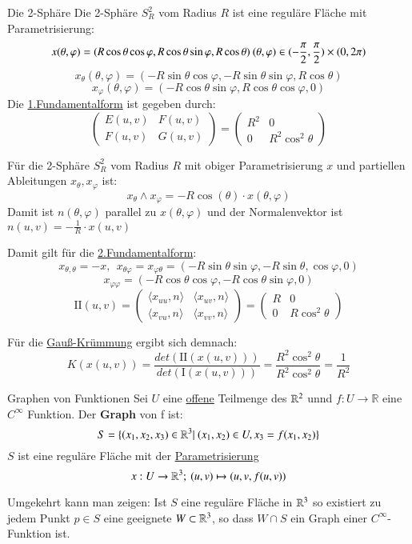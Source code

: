 \begin{titleDef}{Die 2-Sphäre}
\label{regSphere}
Die 2-Sphäre $S_R^2$ vom Radius $R$ ist eine reguläre Fläche mit Parametrisierung:
$$x(\theta,\varphi)=(R\cos\theta\cos\varphi,R\cos\theta\sin\varphi,R\cos\theta)\: (\theta,\varphi)\in(-\frac{\pi}{2},\frac{\pi}{2})\times(0,2\pi)$$
$$x_\theta(\theta,\varphi)=(-R\sin\theta\cos\varphi,-R\sin\theta\sin\varphi,R\cos\theta)$$
$$x_\varphi(\theta,\varphi)=(-R\cos\theta\sin\varphi,R\cos\theta\cos\varphi,0)$$
Die \hyperref[fundamentalformEins]{1.Fundamentalform} ist gegeben durch:
$$\begin{pmatrix}
	E(u,v)&F(u,v)\\
	F(u,v)&G(u,v)
\end{pmatrix}=
\begin{pmatrix}
	R^2&0\\
	0&R^2\cos^2\theta
\end{pmatrix}$$
\par
Für die 2-Sphäre $S_R^2$ vom Radius $R$ mit obiger Parametrisierung $x$ und partiellen Ableitungen $x_\theta,x_\varphi$ ist:
$$x_\theta\wedge x_\varphi=-R\cos(\theta)\cdot x(\theta,\varphi)$$
Damit ist $n(\theta,\varphi)$ parallel zu $x(\theta,\varphi)$ und der Normalenvektor ist\\ $n(u,v)=-\frac{1}{R}\cdot x(u,v)$\par
Damit gilt für die \hyperref[fundamentalzweite]{2.Fundamentalform}:
$$x_{\theta,\theta}=-x,\:\: x_{\theta\varphi}=x_{\varphi\theta}=(-R\sin\theta\sin\varphi,-R\sin\theta,\cos\varphi,0)$$ $$x_{\varphi\varphi}=(-R\cos\theta\cos\varphi,-R\cos\theta\sin\varphi,0)$$
$$\mathrm{II}(u,v)=
\begin{pmatrix} 
	\langle x_{uu},n\rangle & \langle x_{uv},n\rangle\\
	\langle x_{vu},n\rangle & \langle x_{vv},n\rangle
\end{pmatrix}=
\begin{pmatrix}
	R&0\\
	0&R\cos^2\theta
\end{pmatrix}$$
\par
Für die \hyperref[gausskruemmung]{Gauß-Krümmung} ergibt sich demnach:
$$K(x(u,v))=\frac{det(\mathrm{II}(x(u,v)))}{det(\mathrm{I}(x(u,v)))}=
\frac{R^2\cos^2\theta}{R^2\cos^2\theta}=\frac{1}{R^2}$$
\end{titleDef}

\begin{titleDef}{Graphen von Funktionen}
\label{regGraph}
Sei $U$ eine \hyperref[offen]{offene} Teilmenge des $\mathbb{R}^2$ unnd $f:U\to\mathbb{R}$ eine $C^\infty$ Funktion. Der \textbf{Graph} von f ist:
$$S=\{(x_1,x_2,x_3)\in\mathbb{R}^3|\ (x_1,x_2)\in U,x_3=f(x_1,x_2)\}$$
$S$ ist eine reguläre Fläche mit der \hyperref[parametrisierung]{Parametrisierung}
$$x:U\to\mathbb{R}^3;\: (u,v)\mapsto(u,v,f(u,v))$$\par
Umgekehrt kann man zeigen: Ist $S$ eine reguläre Fläche in $\mathbb{R}^3$ so existiert zu jedem Punkt $p\in S$ eine geeignete \offUm $W\subset\mathbb{R}^3$, so dass $W\cap S$ ein Graph einer $C^\infty$-Funktion ist.
\end{titleDef}